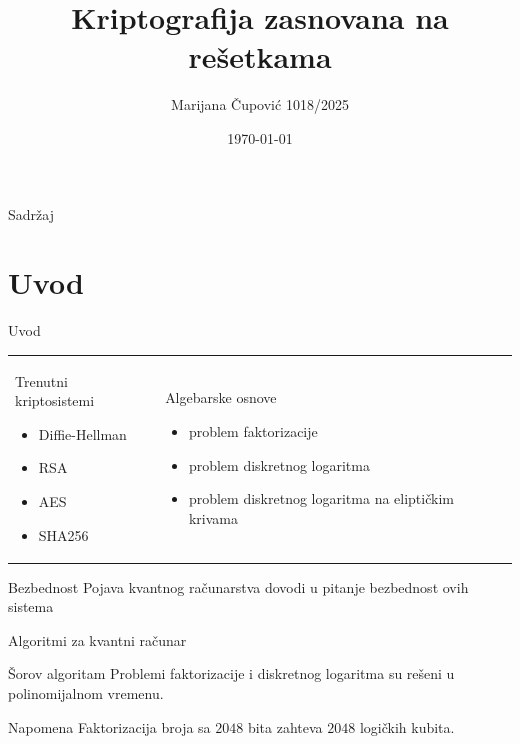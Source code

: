 \documentclass[aspectratio=1610]{beamer}
\title{Kriptografija zasnovana na rešetkama}
\author{Marijana Čupović 1018/2025}
\date{\today}
\begin{document}
\begin{frame} 
\titlepage
\end{frame}

\begin{frame}{Sadržaj}
\tableofcontents
\end{frame}

\section{Uvod}
\begin{frame}{Uvod}
\begin{tabular}{p{} p{}}
    \begin{block}{Trenutni kriptosistemi}
        \begin{itemize}
            \item Diffie-Hellman
            \item RSA
            \item AES
            \item SHA256
        \end{itemize}
    \end{block}
     &
    \begin{block}{Algebarske osnove}
        \begin{itemize}
            \item problem faktorizacije
            \item problem diskretnog logaritma
            \item problem diskretnog logaritma na eliptičkim krivama
        \end{itemize}
    \end{block} 
\end{tabular}

\begin{alertblock}{Bezbednost}
    Pojava kvantnog računarstva dovodi u pitanje bezbednost ovih sistema
\end{alertblock}
\end{frame}

\begin{frame}{Algoritmi za kvantni računar}

    \begin{block}{Šorov algoritam}
        Problemi faktorizacije i diskretnog logaritma su rešeni u polinomijalnom vremenu.
    \end{block}

    \begin{exampleblock}{Napomena}
        Faktorizacija broja sa $2048$ bita zahteva $2048$ logičkih kubita.
    \end{exampleblock}
\end{frame}
\end{document}
